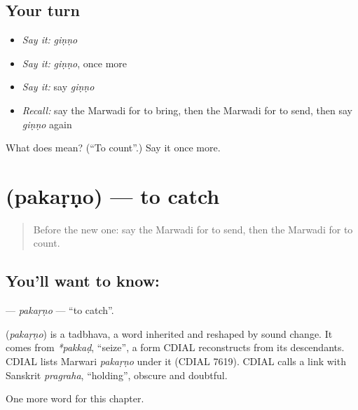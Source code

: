 \subsection*{Your turn}
\begin{itemize}
\raggedright
  \item \emph{Say it:} \emph{giṇṇo}
  \item \emph{Say it:} \emph{giṇṇo}, once more
  \item \emph{Say it:} say \emph{giṇṇo}
  \item \emph{Recall:} say the Marwadi for to bring, then the Marwadi for to send, then say \emph{giṇṇo} again
\end{itemize}

\begin{tcolorbox}[breakable,colback=teal!4,colframe=teal!35!black,title={Before you move on}]
What does  mean? (\textquotedblleft{}To count\textquotedblright{}.) Say it once more.
\end{tcolorbox}
\section[\texorpdfstring{\mw{पकड़णो} (pakaṛṇo)}{पकड़णो (pakaṛṇo)}]{ (pakaṛṇo) — to catch}

\label{lesson:MW-C56-pakarno}



\begin{quote}
Before the new one: say the Marwadi for to send, then the Marwadi for to count.
\end{quote}

\subsection*{You'll want to know: }
\textbf{} — \emph{pakaṛṇo} — \textquotedblleft{}to catch\textquotedblright{}.

\begin{cousinweb}
\textbf{} (\emph{pakaṛṇo}) is a tadbhava, a word inherited and reshaped by sound change. It comes from \emph{*pakkaḍ}, \textquotedblleft{}seize\textquotedblright{}, a form CDIAL reconstructs from its descendants. CDIAL lists Marwari \emph{pakaṛṇo} under it (CDIAL 7619). CDIAL calls a link with Sanskrit \emph{pragraha}, \textquotedblleft{}holding\textquotedblright{}, obscure and doubtful.
\end{cousinweb}

\begin{grammarlens}[title={What you've built}]
One more word for this chapter.
\end{grammarlens}

